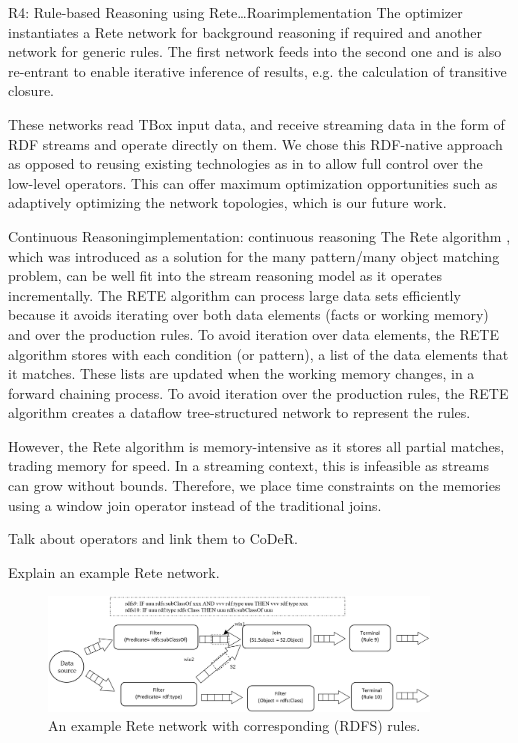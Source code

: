 \begin{nestedsection}{R4: Rule-based Reasoning using Rete\dots Roar}{implementation}
	The optimizer instantiates a Rete network for background reasoning if required and another network for generic rules.
	The first network feeds into the second one and is also re-entrant to enable iterative inference of results, e.g. the calculation of transitive closure.
	
	These networks read TBox input data, and receive streaming data in the form of RDF streams and operate directly on them.
	We chose this RDF-native approach as opposed to reusing existing technologies as in \citep{C-SPARQL,streaming-sparql} to allow full control over the low-level operators.
	This can offer maximum optimization opportunities such as adaptively optimizing the network topologies, which is our future work.

	\begin{nestedsection}{Continuous Reasoning}{implementation: continuous reasoning}
		The Rete algorithm \citep{forgy79}, which was introduced as a solution for the many pattern/many object matching problem, can be well fit into the stream reasoning model as it operates incrementally.
		The RETE algorithm can process large data sets efficiently because it avoids iterating over both data elements (facts or working memory) and over the production rules.
		To avoid iteration over data elements, the RETE algorithm stores with each condition (or pattern), a list of the data elements that it matches.
		These lists are updated when the working memory changes, in a forward chaining process.
		To avoid iteration over the production rules, the RETE algorithm creates a dataflow tree-structured network to represent the rules.
		
		However, the Rete algorithm is memory-intensive as it stores all partial matches, trading memory for speed.
		In a streaming context, this is infeasible as streams can grow without bounds.
		Therefore, we place time constraints on the memories using a window join operator instead of the traditional joins.

		Talk about operators and link them to CoDeR.

 		Explain an example Rete network.

 		\begin{figure}
 			\centering
 			\includegraphics[width=0.9\textwidth]{example-rete-network}
 			\caption{An example Rete network with corresponding (RDFS) rules.}
 		\end{figure}
	\end{nestedsection}
\end{nestedsection}